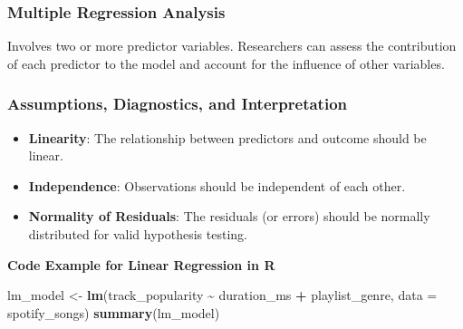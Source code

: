 \documentclass[
  b5paper]{book}
\newenvironment{Shaded}{\begin{snugshade}}{\end{snugshade}}
\newcommand{\AttributeTok}[1]{\textcolor[rgb]{0.13,0.29,0.53}{#1}}
\newcommand{\FunctionTok}[1]{\textcolor[rgb]{0.13,0.29,0.53}{\textbf{#1}}}
\newcommand{\NormalTok}[1]{#1}
\newcommand{\OtherTok}[1]{\textcolor[rgb]{0.56,0.35,0.01}{#1}}
\newcommand{\SpecialCharTok}[1]{\textcolor[rgb]{0.81,0.36,0.00}{\textbf{#1}}}
\providecommand{\tightlist}{%
  \setlength{\itemsep}{0pt}\setlength{\parskip}{0pt}}
\begin{document}
\hypertarget{multiple-regression-analysis}{%
\subsubsection{Multiple Regression Analysis}\label{multiple-regression-analysis}}

Involves two or more predictor variables. Researchers can assess the contribution of each predictor to the model and account for the influence of other variables.

\hypertarget{assumptions-diagnostics-and-interpretation}{%
\subsubsection{Assumptions, Diagnostics, and Interpretation}\label{assumptions-diagnostics-and-interpretation}}

\begin{itemize}
\tightlist
\item
  \textbf{Linearity}: The relationship between predictors and outcome should be linear.
\item
  \textbf{Independence}: Observations should be independent of each other.
\item
  \textbf{Normality of Residuals}: The residuals (or errors) should be normally distributed for valid hypothesis testing.
\end{itemize}

\textbf{Code Example for Linear Regression in R}

\begin{Shaded}
\begin{Highlighting}[]
\NormalTok{lm\_model }\OtherTok{\textless{}{-}} \FunctionTok{lm}\NormalTok{(track\_popularity }\SpecialCharTok{\textasciitilde{}}\NormalTok{ duration\_ms }\SpecialCharTok{+}\NormalTok{ playlist\_genre, }\AttributeTok{data =}\NormalTok{ spotify\_songs)}
\FunctionTok{summary}\NormalTok{(lm\_model)}
\end{Highlighting}
\end{Shaded}
\end{document}
